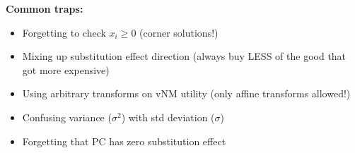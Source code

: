 \documentclass[11pt]{article}
\begin{document}
\begin{warning}
\textbf{Common traps:}
\begin{itemize}
    \item Forgetting to check $x_i \geq 0$ (corner solutions!)
    \item Mixing up substitution effect direction (always buy LESS of the good that got more expensive)
    \item Using arbitrary transforms on vNM utility (only affine transforms allowed!)
    \item Confusing variance ($\sigma^2$) with std deviation ($\sigma$)
    \item Forgetting that PC has zero substitution effect
\end{itemize}
\end{warning}
\end{document}
